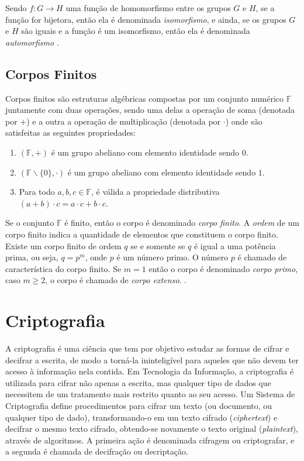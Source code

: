 Sendo $f: G \rightarrow H$ uma função de homomorfismo entre os grupos \(G\) e \(H\), se a função for bijetora, então ela é denominada \textit{isomorfismo}, e ainda, se os grupos \(G\) e \(H\) são iguais e a função é um isomorfismo, então ela é denominada \textit{automorfismo} \cite{Shokranian:2010}.

%
%
\subsection{Corpos Finitos}
Corpos finitos são estruturas algébricas compostas por um conjunto numérico \(\mathbb{F}\) juntamente com duas operações, sendo uma delas a operação de soma (denotada por $+$) e a outra a operação de multiplicação (denotada por $\cdot$) onde são satisfeitas as seguintes propriedades: \cite{Guide}

\begin{enumerate}
\item $(\mathbb{F}, +)$ é um grupo abeliano com elemento identidade sendo \(0\).
\item $(\mathbb{F} \backslash \{0\}, \cdot)$ é um grupo abeliano com elemento identidade sendo $1$.
\item Para todo $a, b, c \in \mathbb{F}$, é válida a propriedade distributiva $(a + b) \cdot c = a \cdot c + b \cdot c$.
\end{enumerate}

Se o conjunto \(\mathbb{F}\) é finito, então o corpo é denominado \textit{corpo finito}. A \textit{ordem} de um corpo finito indica a quantidade de elementos que constituem o corpo finito. Existe um corpo finito de ordem \(q\) se e somente se \(q\) é igual a uma potência prima, ou seja, $q = p^{m}$, onde \(p\) é um número primo. O número \(p\) é chamado de característica do corpo finito. Se $m = 1$ então o corpo é denominado \textit{corpo primo}, caso $m \geq 2$, o corpo é chamado de \textit{corpo extenso}. \cite{Guide}.

%
%
\section{Criptografia} \label{sec:criptografia}
A criptografia é uma ciência que tem por objetivo estudar as formas de cifrar e decifrar a escrita, de modo a torná-la ininteligível para aqueles que não devem ter acesso à informação nela contida. Em Tecnologia da Informação, a criptografia é utilizada para cifrar não apenas a escrita, mas qualquer tipo de dados que necessitem de um tratamento mais restrito quanto ao seu acesso. Um Sistema de Criptografia define procedimentos para cifrar um texto (ou documento, ou qualquer tipo de dado), transformando-o em um texto cifrado (\textit{ciphertext}) e decifrar o mesmo texto cifrado, obtendo-se novamente o texto original (\textit{plaintext}), através de algoritmos. A primeira ação é denominada cifragem ou criptografar, e a segunda é chamada de decifração ou decriptação. \cite{Portnoi:2005}

